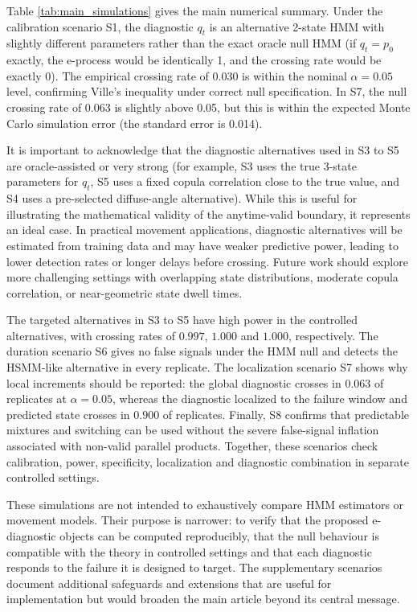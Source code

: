\documentclass[pdflatex,sn-basic]{sn-jnl}
\theoremstyle{thmstyleone}
\theoremstyle{thmstyletwo}
\theoremstyle{thmstylethree}
\newcommand{\1}{\mathbf 1}
\begin{document}
Table \ref{tab:main_simulations} gives the main numerical summary. Under the calibration scenario S1, the diagnostic $q_t$ is an alternative 2-state HMM with slightly different parameters rather than the exact oracle null HMM (if $q_t = p_0$ exactly, the e-process would be identically 1, and the crossing rate would be exactly 0). The empirical crossing rate of 0.030 is within the nominal $\alpha = 0.05$ level, confirming Ville's inequality under correct null specification. In S7, the null crossing rate of 0.063 is slightly above 0.05, but this is within the expected Monte Carlo simulation error (the standard error is 0.014).

It is important to acknowledge that the diagnostic alternatives used in S3 to S5 are oracle-assisted or very strong (for example, S3 uses the true 3-state parameters for $q_t$, S5 uses a fixed copula correlation close to the true value, and S4 uses a pre-selected diffuse-angle alternative). While this is useful for illustrating the mathematical validity of the anytime-valid boundary, it represents an ideal case. In practical movement applications, diagnostic alternatives will be estimated from training data and may have weaker predictive power, leading to lower detection rates or longer delays before crossing. Future work should explore more challenging settings with overlapping state distributions, moderate copula correlation, or near-geometric state dwell times.

The targeted alternatives in S3 to S5 have high power in the controlled alternatives, with crossing rates of $0.997$, $1.000$ and $1.000$, respectively. The duration scenario S6 gives no false signals under the HMM null and detects the HSMM-like alternative in every replicate. The localization scenario S7 shows why local increments should be reported: the global diagnostic crosses in $0.063$ of replicates at $\alpha=0.05$, whereas the diagnostic localized to the failure window and predicted state crosses in $0.900$ of replicates. Finally, S8 confirms that predictable mixtures and switching can be used without the severe false-signal inflation associated with non-valid parallel products. Together, these scenarios check calibration, power, specificity, localization and diagnostic combination in separate controlled settings.

These simulations are not intended to exhaustively compare HMM estimators or movement models. Their purpose is narrower: to verify that the proposed e-diagnostic objects can be computed reproducibly, that the null behaviour is compatible with the theory in controlled settings and that each diagnostic responds to the failure it is designed to target. The supplementary scenarios document additional safeguards and extensions that are useful for implementation but would broaden the main article beyond its central message.
\end{document}
